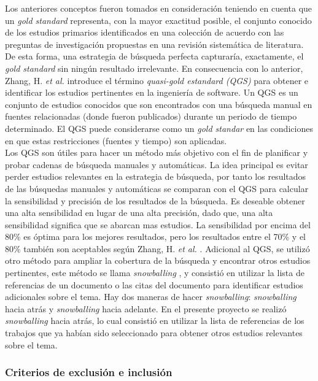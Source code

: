 Los anteriores conceptos fueron tomados en consideración teniendo en cuenta que un \textit{gold standard} representa, con la mayor exactitud posible, el conjunto conocido de los estudios primarios identificados en una colección de acuerdo con las preguntas de investigación propuestas en una revisión sistemática de literatura. De esta forma, una estrategia de búsqueda perfecta capturaría, exactamente, el \textit{gold standard} sin ningún resultado irrelevante. En consecuencia con lo anterior, Zhang, H. \textit{et al.} introduce el término \textit{quasi-gold estandard (QGS)} para obtener e identificar los estudios pertinentes en la ingeniería de software. Un QGS es un conjunto de estudios conocidos que son encontrados con una búsqueda manual en fuentes relacionadas (donde fueron publicados) durante un periodo de tiempo determinado. El QGS puede considerarse como un \textit{gold standar} en las condiciones en que estas restricciones (fuentes y tiempo) son aplicadas.
\\
Los QGS son útiles para hacer un método más objetivo con el fin de planificar y probar cadenas de búsqueda manuales y automáticas. La idea principal es evitar perder estudios relevantes en la estrategia de búsqueda, por tanto los resultados de las búsquedas manuales y automáticas se comparan con el QGS para calcular la sensibilidad y precisión de los resultados de la búsqueda. Es deseable obtener una alta sensibilidad en lugar de una alta precisión, dado que, una alta sensibilidad significa que se abarcan mas estudios. La sensibilidad por encima del 80\% es óptima para los mejores resultados, pero los resultados entre el 70\% y el 80\% también son aceptables según Zhang, H. \textit{et al.} \cite{Zhang2011}. Adicional al QGS, se utilizó otro método para ampliar la cobertura de la búsqueda y encontrar otros estudios pertinentes, este método se llama \textit{snowballing} \cite{Wohlin2014}, y consistió en utilizar la lista de referencias de un documento o las citas del documento para identificar estudios adicionales sobre el tema. Hay dos maneras de hacer \textit{snowballing}: \textit{snowballing} hacia atrás y \textit{snowballing} hacia adelante. En el presente proyecto se realizó \textit{snowballing} hacia atrás, lo cual consistió en utilizar la lista de referencias de los trabajos que ya habían sido seleccionado para obtener otros estudios relevantes sobre el tema. 

\subsubsection{Criterios de exclusión e inclusión }

